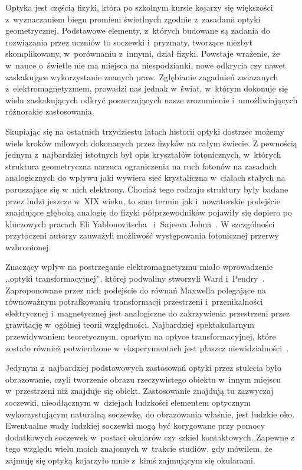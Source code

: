 Optyka jest częścią fizyki, która po szkolnym kursie kojarzy się większości z~wyznaczaniem biegu promieni świetlnych zgodnie z~zasadami optyki geometrycznej. Podstawowe elementy, z~których budowane są zadania do rozwiązania przez uczniów to soczewki i~pryzmaty, tworzące niezbyt skomplikowany, w~porównaniu z~innymi, dział fizyki. Powstaje wrażenie, że w~nauce o~świetle nie ma miejsca na niespodzianki, nowe odkrycia czy nawet zaskakujące wykorzystanie znanych praw. Zgłębianie zagadnień zwiazanych z~elektromagnetyzmem, prowadzi nas jednak w~świat, w~którym dokonuje się wielu zaskakujących odkryć poszerzających nasze zrozumienie i~umożliwiających różnorakie zastosowania.

Skupiając się na ostatnich trzydziestu latach historii optyki dostrzec możemy wiele kroków milowych dokonanych przez fizyków na całym świecie. Z pewnością jednym z~najbardziej istotnych był opis kryształów fotonicznych, w~których struktura geometryczna narzuca ograniczenia na ruch fotonów na zasadach analogicznych do wpływu jaki wywiera sieć krystaliczna w~ciałach stałych na poruszające się w~nich elektrony. Chociaż tego rodzaju struktury były badane przez ludzi jeszcze w~XIX wieku, to sam termin jak i~nowatorskie podejście znajdujące głęboką analogię do fizyki półprzewodników pojawiły się dopiero po kluczowych pracach Eli Yablonovitscha~\cite{yablonovitch1987inhibited} i~Sajeeva Johna~\cite{john1987strong}. W szczgólności przytoczeni autorzy zauważyli możliwość występowania fotonicznej przerwy wzbronionej.

Znaczący wpływ na postrzeganie elektromagnetyzmu miało wprowadzenie ,,optyki transformacyjnej'', której podwaliny stworzyli Ward i~Pendry~\cite{ward1996refraction}. Zaproponowane  przez nich podejście do równań Maxwella polegające na równoważnym potrafkowaniu transformacji przestrzeni i~przenikalności elektrycznej i~magnetycznej jest analogiczne do zakrzywienia przestrzeni przez grawitację w~ogólnej teorii względności. Najbardziej spektakularnym przewidywaniem teoretycznym, opartym na optyce transformacyjnej, które zostało również potwierdzone w~eksperymentach jest płaszcz niewidzialności~\cite{schurig2006metamaterial}.

Jedynym z~najbardziej podstawowych zastosowań optyki przez stulecia było obrazowanie, czyli tworzenie obrazu rzeczywistego obiektu w~innym miejscu w~przestrzeni niż znajduje się obiekt. Zastosowanie znajdują tu zazwyczaj soczewki, nieodłącznym w~dziejach ludzkości elementem optycznym wykorzystującym naturalną soczewkę, do obrazowania właśnie, jest ludzkie oko. Ewentualne wady ludzkiej soczewki mogą być korygowane przy pomocy dodatkowych soczewek w~postaci okularów czy szkieł kontaktowych. Zapewne z tego względu wielu moich znajomych w~trakcie studiów, gdy mówiłem, że zajmuję się optyką kojarzyło mnie z~kimś zajmującym się okularami.

